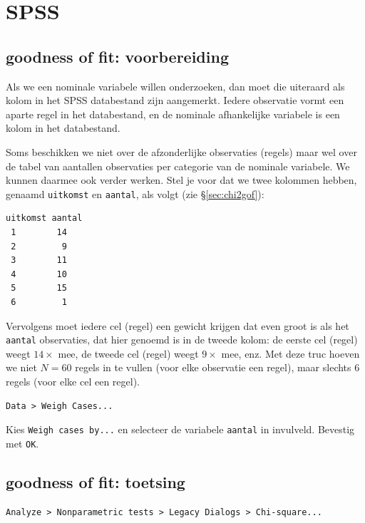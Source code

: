\documentclass[
]{book}
\begin{document}
\hypertarget{spss-14}{%
\section{SPSS}\label{spss-14}}

\hypertarget{goodness-of-fit-voorbereiding}{%
\subsection{goodness of fit: voorbereiding}\label{goodness-of-fit-voorbereiding}}

Als we een nominale variabele willen onderzoeken, dan moet die uiteraard
als kolom in het SPSS databestand zijn aangemerkt. Iedere observatie
vormt een aparte regel in het databestand, en de nominale afhankelijke
variabele is een kolom in het databestand.

Soms beschikken we niet over de afzonderlijke observaties (regels) maar
wel over de tabel van aantallen observaties per categorie van de
nominale variabele. We kunnen daarmee ook verder werken. Stel je voor
dat we twee kolommen hebben, genaamd \texttt{uitkomst} en \texttt{aantal}, als volgt
(zie §\ref{sec:chi2gof}):

\begin{verbatim}
uitkomst aantal
 1        14
 2         9
 3        11
 4        10
 5        15
 6         1
\end{verbatim}

Vervolgens moet iedere cel (regel) een gewicht krijgen dat even groot is
als het \texttt{aantal} observaties, dat hier genoemd is in de tweede kolom: de
eerste cel (regel) weegt \(14\times\) mee, de tweede cel (regel) weegt
\(9\times\) mee, enz. Met deze truc hoeven we niet \(N=60\) regels in te
vullen (voor elke observatie een regel), maar slechts 6 regels (voor
elke cel een regel).

\begin{verbatim}
Data > Weigh Cases... 
\end{verbatim}

Kies \texttt{Weigh\ cases\ by...} en selecteer de variabele \texttt{aantal} in
invulveld. Bevestig met \texttt{OK}.

\hypertarget{goodness-of-fit-toetsing}{%
\subsection{goodness of fit: toetsing}\label{goodness-of-fit-toetsing}}

\begin{verbatim}
Analyze > Nonparametric tests > Legacy Dialogs > Chi-square...
\end{verbatim}
\end{document}
